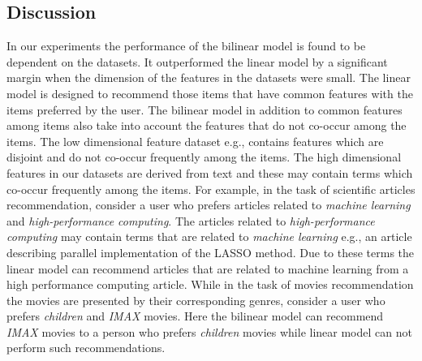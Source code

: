 \subsection{Discussion}
In our experiments the performance of the bilinear model is found to be dependent on
the datasets. It outperformed the linear model by a significant margin when the 
dimension of the features in the datasets were small. 
The linear model is designed to recommend those items that have common features with the
items preferred by the user. The bilinear model in addition to common features
among items also take into account the features that do not co-occur among the items. 
The low dimensional feature dataset e.g., \MLHR contains features which are disjoint and do not co-occur
frequently among the items. The high dimensional features in our datasets are derived from text and these
may contain terms which co-occur frequently among the items. For example, in the task of scientific articles recommendation, consider a user
who prefers articles related to \textit{machine learning} and \textit{high-performance computing}.
The articles related to \textit{high-performance computing} may contain terms that are
related to \textit{machine learning} e.g., an article describing parallel implementation
of the LASSO method. Due to these terms the linear model can recommend articles
that are related to machine learning from a high performance computing article.
While in the task of movies recommendation the movies are presented by their
corresponding genres, consider a user who prefers \textit{children} and 
\textit{IMAX} movies.  Here the bilinear model can recommend
\textit{IMAX} movies to a person who prefers \textit{children} movies while
linear model can not perform such recommendations.

\afterpage{\clearpage}






